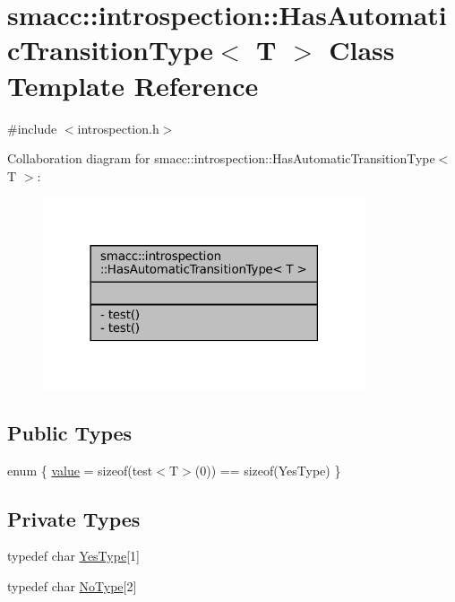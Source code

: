 \hypertarget{classsmacc_1_1introspection_1_1HasAutomaticTransitionType}{}\section{smacc\+:\+:introspection\+:\+:Has\+Automatic\+Transition\+Type$<$ T $>$ Class Template Reference}
\label{classsmacc_1_1introspection_1_1HasAutomaticTransitionType}


{\ttfamily \#include $<$introspection.\+h$>$}



Collaboration diagram for smacc\+:\+:introspection\+:\+:Has\+Automatic\+Transition\+Type$<$ T $>$\+:
\nopagebreak
\begin{figure}[H]
\begin{center}
\leavevmode
\includegraphics[width=270pt]{classsmacc_1_1introspection_1_1HasAutomaticTransitionType__coll__graph}
\end{center}
\end{figure}
\subsection*{Public Types}
\begin{DoxyCompactItemize}
\item 
enum \{ \hyperlink{classsmacc_1_1introspection_1_1HasAutomaticTransitionType_ac663d77745eac0f2b2ceb29e4c8b300ba8aba42189dc17891761a49375684776d}{value} = sizeof(test$<$T$>$(0)) == sizeof(Yes\+Type)
 \}
\end{DoxyCompactItemize}
\subsection*{Private Types}
\begin{DoxyCompactItemize}
\item 
typedef char \hyperlink{classsmacc_1_1introspection_1_1HasAutomaticTransitionType_abeb599df547eb3db36684b6cb343eade}{Yes\+Type}\mbox{[}1\mbox{]}
\item 
typedef char \hyperlink{classsmacc_1_1introspection_1_1HasAutomaticTransitionType_aa2e976214fc770f53aaae67fc049caab}{No\+Type}\mbox{[}2\mbox{]}
\end{DoxyCompactItemize}
